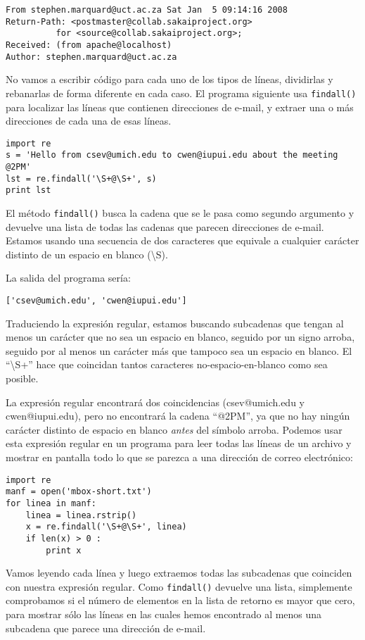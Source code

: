 \beforeverb
\begin{verbatim}
From stephen.marquard@uct.ac.za Sat Jan  5 09:14:16 2008
Return-Path: <postmaster@collab.sakaiproject.org>
          for <source@collab.sakaiproject.org>;
Received: (from apache@localhost)
Author: stephen.marquard@uct.ac.za
\end{verbatim}
\afterverb
%
No vamos a escribir código para cada uno de los tipos de líneas, dividirlas y rebanarlas de forma diferente
en cada caso. El programa siguiente usa {\tt findall()} para localizar las líneas que contienen
direcciones de e-mail, y extraer una o más direcciones de cada una de esas líneas.

\beforeverb
\begin{verbatim}
import re
s = 'Hello from csev@umich.edu to cwen@iupui.edu about the meeting @2PM'
lst = re.findall('\S+@\S+', s)
print lst
\end{verbatim}
\afterverb
%
El método {\tt findall()} busca la cadena que se le pasa como segundo argumento y devuelve una lista de
todas las cadenas que parecen direcciones de e-mail. Estamos usando una secuencia de dos caracteres
que equivale a cualquier carácter distinto de un espacio en blanco ({\textbackslash}S). 

La salida del programa sería:

\beforeverb
\begin{verbatim}
['csev@umich.edu', 'cwen@iupui.edu']
\end{verbatim}
\afterverb
%
Traduciendo la expresión regular, estamos buscando subcadenas que tengan al menos un
carácter que no sea un espacio en blanco, seguido por un signo arroba, seguido por al menos un carácter más
que tampoco sea un espacio en blanco. El ``{\textbackslash}S+'' hace que coincidan tantos caracteres
no-espacio-en-blanco como sea posible.

La expresión regular encontrará dos coincidencias (csev@umich.edu y cwen@iupui.edu), pero no
encontrará la cadena ``@2PM'', ya que no hay ningún carácter distinto de espacio en blanco {\em antes} del
símbolo arroba. Podemos usar esta expresión regular en un programa para leer todas las líneas de un archivo
y mostrar en pantalla todo lo que se parezca a una dirección de correo electrónico: 

\beforeverb
\begin{verbatim}
import re
manf = open('mbox-short.txt')
for linea in manf:
    linea = linea.rstrip()
    x = re.findall('\S+@\S+', linea)
    if len(x) > 0 :
        print x
\end{verbatim}
\afterverb
%
Vamos leyendo cada línea y luego extraemos todas las subcadenas que coinciden con nuestra expresión regular.
Como {\tt findall()} devuelve una lista, simplemente comprobamos si el número de elementos en la lista
de retorno es mayor que cero, para mostrar sólo las líneas en las cuales hemos encontrado al menos una subcadena
que parece una dirección de e-mail.

